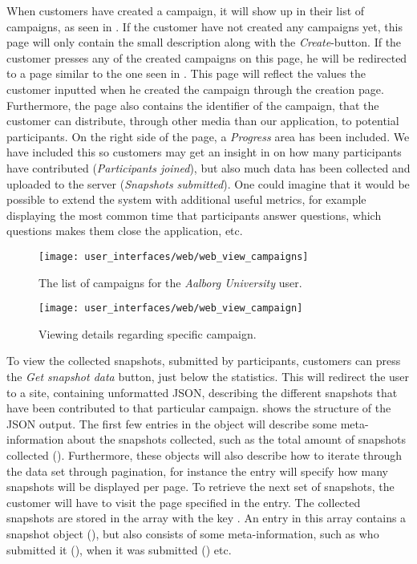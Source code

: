 When customers have created a campaign, it will show up in their list of campaigns, as seen in . If the customer have not created any campaigns yet, this page will only contain the small description along with the \emph{Create}-button. If the customer presses any of the created campaigns on this page, he will be redirected to a page similar to the one seen in . This page will reflect the values the customer inputted when he created the campaign through the creation page. Furthermore, the page also contains the identifier of the campaign, that the customer can distribute, through other media than our application, to potential participants. On the right side of the page, a \emph{Progress} area has been included. We have included this so customers may get an insight in on how many participants have contributed (\emph{Participants joined}), but also much data has been collected and uploaded to the server (\emph{Snapshots submitted}). One could imagine that it would be possible to extend the system with additional useful metrics, for example displaying the most common time that participants answer questions, which questions makes them close the application, etc. 

\begin{figure}[!htbp]
\centering
\texttt{[image: user\_interfaces/web/web\_view\_campaigns]}
\caption{The list of campaigns for the \emph{Aalborg University} user.}
\label{fig:web_view_campaigns}
\end{figure}
\FloatBarrier

\begin{figure}[!htbp]
\centering
\texttt{[image: user\_interfaces/web/web\_view\_campaign]}
\caption{Viewing details regarding specific campaign.}
\label{fig:web_view_campaign}
\end{figure}
\FloatBarrier

To view the collected snapshots, submitted by participants, customers can press the \emph{Get snapshot data} button, just below the statistics. This will redirect the user to a site, containing unformatted JSON, describing the different snapshots that have been contributed to that particular campaign.  shows the structure of the JSON output. The first few entries in the object will describe some meta-information about the snapshots collected, such as the total amount of snapshots collected (). Furthermore, these objects will also describe how to iterate through the data set through pagination, for instance the  entry will specify how many snapshots will be displayed per page. To retrieve the next set of snapshots, the customer will have to visit the page specified in the  entry. The collected snapshots are stored in the array with the key . An entry in this array contains a snapshot object (), but also consists of some meta-information, such as who submitted it (), when it was submitted () etc. 

